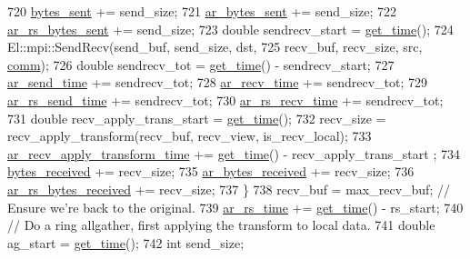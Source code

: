 \begin{DoxyCode}
{720     \hyperlink{classlbann_1_1lbann__comm_ad1f146ae7337ece6266fd307944928e0}{bytes\_sent} += send\_size;
721     \hyperlink{classlbann_1_1lbann__comm_aa520c16eafde742b70daf60866afc6a8}{ar\_bytes\_sent} += send\_size;
722     \hyperlink{classlbann_1_1lbann__comm_ac74bcfb565c1bb6604f336c6d1b647cc}{ar\_rs\_bytes\_sent} += send\_size;
723     \textcolor{keywordtype}{double} sendrecv\_start = \hyperlink{namespacelbann_a478d36031ff0659893c4322cd856157f}{get\_time}();
724     El::mpi::SendRecv(send\_buf, send\_size, dst,
725                       recv\_buf, recv\_size, src, \hyperlink{file__io_8cpp_ab048c6f9fcbcfaa57ce68b00263dbebe}{comm});
726     \textcolor{keywordtype}{double} sendrecv\_tot = \hyperlink{namespacelbann_a478d36031ff0659893c4322cd856157f}{get\_time}() - sendrecv\_start;
727     \hyperlink{classlbann_1_1lbann__comm_a60a664f47efb52d9936b72d34059d1ef}{ar\_send\_time} += sendrecv\_tot;
728     \hyperlink{classlbann_1_1lbann__comm_a4c9323938961c3524dc67f4b7b47e3ae}{ar\_recv\_time} += sendrecv\_tot;
729     \hyperlink{classlbann_1_1lbann__comm_aaadab22d368e8004a9877828a3bc9e93}{ar\_rs\_send\_time} += sendrecv\_tot;
730     \hyperlink{classlbann_1_1lbann__comm_adefa0ee8b0a6b74072448e20d40f502d}{ar\_rs\_recv\_time} += sendrecv\_tot;
731     \textcolor{keywordtype}{double} recv\_apply\_trans\_start = \hyperlink{namespacelbann_a478d36031ff0659893c4322cd856157f}{get\_time}();
732     recv\_size = recv\_apply\_transform(recv\_buf, recv\_view, is\_recv\_local);
733     \hyperlink{classlbann_1_1lbann__comm_aa642b0ae2321fa464b0092da527f6375}{ar\_recv\_apply\_transform\_time} += \hyperlink{namespacelbann_a478d36031ff0659893c4322cd856157f}{get\_time}() - recv\_apply\_trans\_start
      ;
734     \hyperlink{classlbann_1_1lbann__comm_afb99f57f7eafc0695bf28e6c26a8120f}{bytes\_received} += recv\_size;
735     \hyperlink{classlbann_1_1lbann__comm_aa5f3c53358bf9002b9fab41918b0c8c1}{ar\_bytes\_received} += recv\_size;
736     \hyperlink{classlbann_1_1lbann__comm_a2c3e1db0f6d2345748132322b0555db7}{ar\_rs\_bytes\_received} += recv\_size;
737   \}
738   recv\_buf = max\_recv\_buf;  \textcolor{comment}{// Ensure we're back to the original.}
739   \hyperlink{classlbann_1_1lbann__comm_a85022d803e339eb14a15129a07876c2b}{ar\_rs\_time} += \hyperlink{namespacelbann_a478d36031ff0659893c4322cd856157f}{get\_time}() - rs\_start;
740   \textcolor{comment}{// Do a ring allgather, first applying the transform to local data.}
741   \textcolor{keywordtype}{double} ag\_start = \hyperlink{namespacelbann_a478d36031ff0659893c4322cd856157f}{get\_time}();
742   \textcolor{keywordtype}{int} send\_size;
}
\end{DoxyCode}
